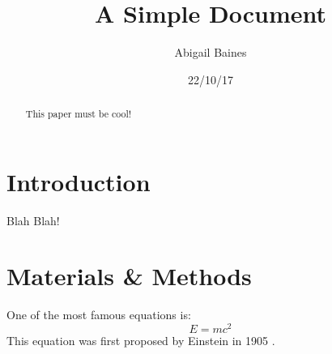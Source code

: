 \documentclass[12pt]{article}
\title{A Simple Document}
\author{Abigail Baines}
\date{22/10/17}
\begin{document}
	\maketitle
	
	\begin{abstract}
		This paper must be cool!
	\end{abstract}

	\section{Introduction}
		Blah Blah!
	
	\section{Materials \& Methods}
	One of the most famous equations is:
	\begin{equation}
		E = mc^2
	\end{equation}
	This equation was first proposed by Einstein in 1905
	\cite{einstein1905does}.

	
	
\end{document}
